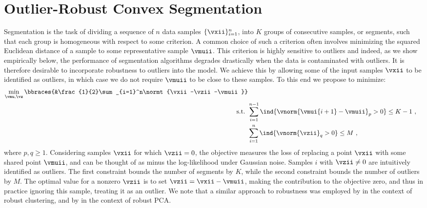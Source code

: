 \section{Outlier-Robust Convex Segmentation}\label{sec:outlierRobustObj}
Segmentation is the task of dividing a sequence of $n$ data samples $\{\vxii\}_{i=1}^n$, into $K$ groups of consecutive samples, or segments, such that each group is homogeneous with respect to some criterion. A common choice of such a criterion often involves minimizing the squared Euclidean distance of a sample to some representative sample $\vmuii$. %
This criterion is highly sensitive to outliers and indeed, as we show empirically below, the performance of segmentation algorithms degrades drastically when the data is contaminated with outliers.
It is therefore desirable to incorporate robustness to outliers into the model. We achieve this by allowing some of the input
samples $\vxii$ to be identified as outliers, in which case we do not require $\vmuii$ to be close to these samples.
To this end we propose to minimize:
\begin{align*}%
    \min_{\vmu,\vz}\bbraces{&\frac{1}{2}\sum_{i=1}^n\normt{\vxii-\vzii-\vmuii}} \\
    \textrm{ s.t. } & \sum_{i=1}^{n-1}\ind{\vnorm{\vmui{i+1}-\vmuii}_p>0}\leq K-1~,\\ %
                    & \sum_{i=1}^n\ind{\vnorm{\vzii}_q>0}\leq M~,
\end{align*}
where $p,q\geq 1$. Considering samples $\vxii$ for which $\vzii=0$, the objective measures the loss of replacing a point $\vxii$ with some shared point $\vmuii$, and can be thought of as minus the log-likelihood under Gaussian noise. Samples $i$ with $\vzii\neq0$ are intuitively identified as outliers. The first constraint bounds the number of segments by $K$,
while the second constraint bounds the number of outliers by $M$.
The optimal value for a nonzero $\vzii$ is to set $\vzii=\vxii-\vmuii$,
making the contribution to the objective zero, and thus in practice
ignoring this sample, treating it as an outlier. We note that a similar approach to robustness was employed by \cite{forero2011outlier} in the context of robust clustering, and by \cite{mateos2012robust} in the context of robust PCA.
